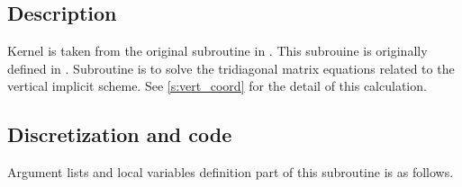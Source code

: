 \section{}

\subsection{Description}

Kernel  is taken from the original subroutine
 in \NICAM.
%
This subrouine is originally defined in .
%
Subroutine  is to solve the tridiagonal matrix
equations related to the vertical implicit scheme. See
\autoref{s:vert_coord} for the detail of this calculation.


\subsection{Discretization and code}

Argument lists and local variables definition part of this subroutine is
as follows.

